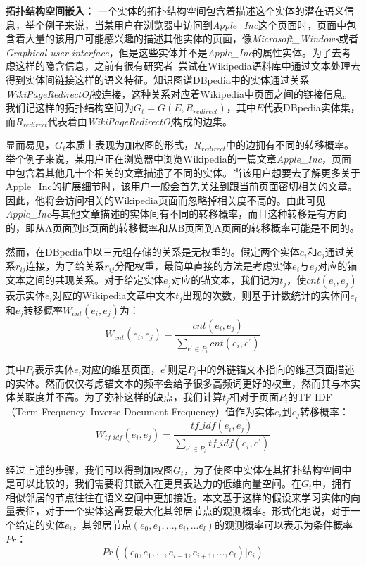 \textbf{拓扑结构空间嵌入：}
一个实体的拓扑结构空间包含着描述这个实体的潜在语义信息，举个例子来说，当某用户在浏览器中访问到\emph{Apple\_Inc}这个页面时，页面中包含着大量的该用户可能感兴趣的描述其他实体的页面，像\emph{Microsoft\_Windows}或者\emph{Graphical user interface}，但是这些实体并不是\emph{Apple\_Inc}的属性实体。为了去考虑这样的隐含信息，之前有很有研究者~\cite{aaai/ZhangZH15, aaai/GongXH18}尝试在Wikipedia语料库中通过文本处理去得到实体间链接这样的语义特征。知识图谱DBpedia中的实体通过关系\emph{WikiPageRedirectOf}被连接，这种关系对应着Wikipedia中页面之间的链接信息。我们记这样的拓扑结构空间为$G_t = G(E, R_{redirect})$，其中$E$代表DBpedia实体集，而$R_{redirect}$代表着由\emph{WikiPageRedirectOf}构成的边集。

显而易见，$G_t$本质上表现为加权图的形式，$R_{redirect}$中的边拥有不同的转移概率。举个例子来说，某用户正在浏览器中浏览Wikipedia的一篇文章\emph{Apple\_Inc}，页面中包含着其他几十个相关的文章描述了不同的实体。当该用户想要去了解更多关于{Apple\_Inc}的扩展细节时，该用户一般会首先关注到跟当前页面密切相关的文章。因此，他将会访问相关的Wikipedia页面而忽略掉相关度不高的。由此可见\emph{Apple\_Inc}与其他文章描述的实体间有不同的转移概率，而且这种转移是有方向的，即从A页面到B页面的转移概率和从B页面到A页面的转移概率可能是不同的。

然而，在DBpedia中以三元组存储的关系是无权重的。假定两个实体$e_i$和$e_j$通过关系$r_{ij}$连接，为了给关系$r_{ij}$分配权重，最简单直接的方法是考虑实体$e_i$与$e_j$对应的锚文本之间的共现关系。对于给定实体$e_j$对应的锚文本，我们记为$t_j$，使$cnt(e_i, e_j)$表示实体$e_i$对应的Wikipedia文章中文本$t_j$出现的次数，则基于计数统计的实体间$e_i$和$e_j$转移概率$W_{cnt}(e_i, e_j)$为：
\begin{equation}
    \label{cng_formula}
    W_{cnt}(e_i, e_j) = \frac{cnt(e_i, e_j)}{\sum_{e^{'} \in P_i}^{ }cnt(e_i, e^{'})}
\end{equation}

\noindent 其中$P_i$表示实体$e_i$对应的维基页面，$e^{'}$则是$P_i$中的外链锚文本指向的维基页面描述的实体。然而仅仅考虑锚文本的频率会给予很多高频词更好的权重，然而其与本实体关联度并不高。为了弥补这样的缺点，我们计算$t_j$相对于页面$P_i$的TF-IDF（Term Frequency–Inverse Document Frequency）值作为实体$e_i$到$e_j$转移概率：
\begin{equation}
    \label{w_tf-idf_formula}
    W_{tf\_idf}(e_i, e_j) = \frac{tf\_idf(e_i, e_j)}{\sum_{e^{'} \in P_i}^{ }tf\_idf(e_i, e^{'})}
\end{equation}



经过上述的步骤，我们可以得到加权图$G_t$，为了使图中实体在其拓扑结构空间中是可以比较的，我们需要将其嵌入在更具表达力的低维向量空间。在$G_t$中，拥有相似邻居的节点往往在语义空间中更加接近。本文基于这样的假设来学习实体的向量表征，对于一个实体这需要最大化其邻居节点的观测概率。形式化地说，对于一个给定的实体$e_i$，其邻居节点$(e_0, e_1, ..., e_i, ...e_l)$的观测概率可以表示为条件概率$Pr$：
\begin{equation}
    \label{pr}
    Pr((e_0, e_1, ..., e_{i-1}, e_{i+1}, ..., e_l)|e_i)
\end{equation}

